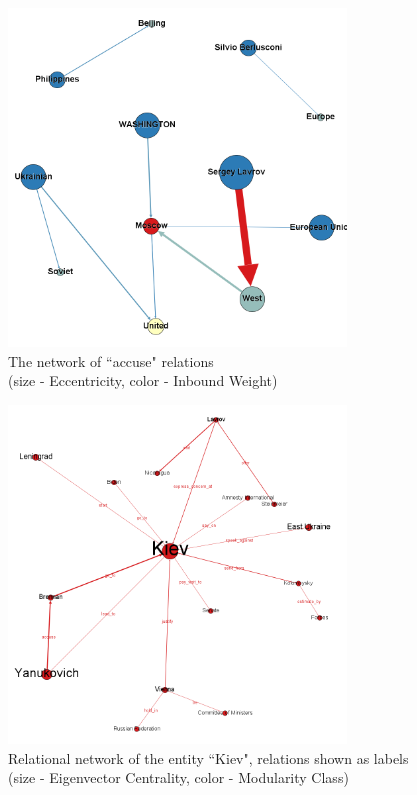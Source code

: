 \documentclass[]{article}
\begin{document}
\begin{figure}[htbp]
  \centering
    \includegraphics[width=0.8\textwidth]{images/Accusations}
    \captionsetup{justification=centering}
    \caption{The network of ``accuse" relations \\ (size - Eccentricity, color - Inbound Weight)}
  \label{Accusations}
\end{figure}
\begin{figure}[htbp]
  \centering
    \includegraphics[width=0.8\textwidth]{images/KievNetwork}
    \captionsetup{justification=centering}
    \caption{Relational network of the entity ``Kiev", relations shown as labels (size - Eigenvector Centrality, color - Modularity Class)}
  \label{KievNetwork}
\end{figure}
% 
\end{document}
